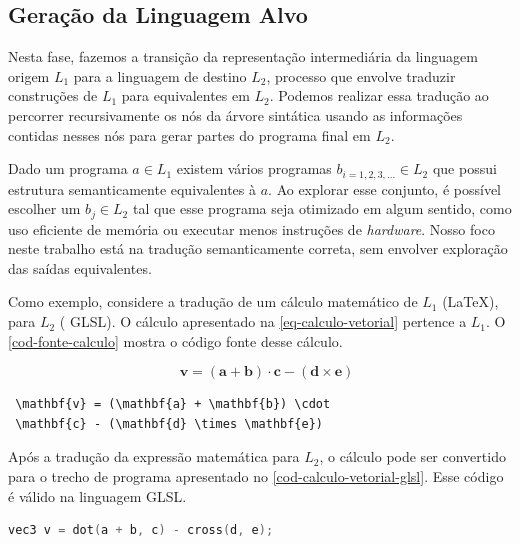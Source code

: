 \documentclass[english, 
               brazil, 
               bsc] %
               {dcomp-abntex2}
\begin{document}
\subsection{Geração da Linguagem Alvo} \label{codegen}


Nesta fase, fazemos a transição da representação intermediária  da linguagem origem \( L_1 \)  para  a linguagem de destino \( L_2 \), processo que envolve traduzir construções de \( L_1 \) para equivalentes em $L_2$. Podemos realizar essa tradução ao percorrer recursivamente os nós da árvore sintática usando as informações contidas nesses nós para gerar partes do programa final em $L_2$.


Dado um programa $a \in L_1$ existem vários programas $b_{i=1,2,3,...} \in L_2$ que possui estrutura semanticamente equivalentes à $a$. Ao explorar esse conjunto, é possível escolher um $b_j \in L_2$ tal que esse programa seja otimizado em algum sentido, como uso eficiente de memória ou executar menos instruções de \textit{hardware}. Nosso foco neste trabalho está na tradução semanticamente correta, sem envolver exploração das saídas  equivalentes.


Como exemplo, considere a tradução de um cálculo matemático de \( L_1 \) (\LaTeX), para \( L_2 \) ( GLSL). O cálculo apresentado na \autoref{eq-calculo-vetorial} pertence a $L_1$. O \autoref{cod-fonte-calculo} mostra o código fonte desse cálculo. 




\begin{equation} \label{eq-calculo-vetorial}
 \quad \mathbf{v} = (\mathbf{a} + \mathbf{b}) \cdot
 \mathbf{c} - (\mathbf{d} \times \mathbf{e})
\end{equation}


\begin{codigo}
\caption{\small Cálculo vetorial em código fonte \LaTeX}
  \label{cod-fonte-calculo}
\begin{lstlisting}
 \mathbf{v} = (\mathbf{a} + \mathbf{b}) \cdot
 \mathbf{c} - (\mathbf{d} \times \mathbf{e})
\end{lstlisting}
\end{codigo}






Após a tradução da expressão matemática para \( L_2 \), o cálculo pode ser convertido para o trecho de programa apresentado no \autoref{cod-calculo-vetorial-glsl}. Esse código é válido na linguagem GLSL.


\begin{codigo}
\caption{\small Cálculo vetorial em código GLSL}
\label{cod-calculo-vetorial-glsl}
\begin{lstlisting}[language = C]
    vec3 v = dot(a + b, c) - cross(d, e);
\end{lstlisting}
\end{codigo}
\end{document}
